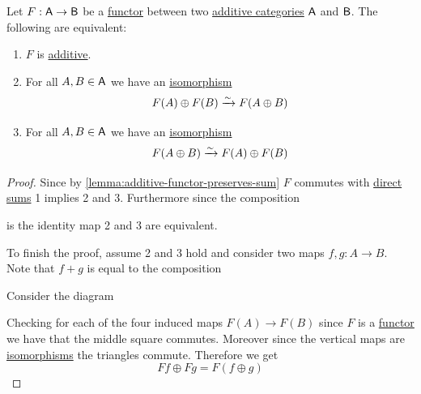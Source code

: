 \documentclass[../../../main]{subfiles}
\begin{document}
\begin{lemma}\label{lemma:additive-functor-characterization}
  Let \(F: \mathsf{A} \to \mathsf{B}\) be a \hyperref[def:functor]{functor} between two \hyperref[def:additive-category]{additive categories} \(\mathsf{A}\) and \(\mathsf{B}\). The following are equivalent:
  \begin{enumerate}
    \item \(F\) is \hyperref[def:additive-functor]{additive}.
    \item For all \(A, B \in \mathsf{A}\) we have an \hyperref[def:categorical-isomorphism]{isomorphism}
          \begin{equation*}
            F(A) \oplus F(B) \xrightarrow{\sim} F(A \oplus B)
          \end{equation*}
    \item For all \(A, B \in \mathsf{A}\) we have an \hyperref[def:categorical-isomorphism]{isomorphism}
          \begin{equation*}
             F(A \oplus B) \xrightarrow{\sim} F(A) \oplus F(B)
          \end{equation*}
  \end{enumerate}
\end{lemma}
\begin{proof}
  Since by \autoref{lemma:additive-functor-preserves-sum} \(F\) commutes with \hyperref[def:direct-sum]{direct sums} 1 implies 2 and 3.
  Furthermore since the composition
  \begin{center}
  \end{center}
  is the identity map 2 and 3 are equivalent.

  To finish the proof, assume 2 and 3 hold and consider two maps \(f, g: A \to B\).
  Note that \(f + g\) is equal to the composition
  \begin{center}
  \end{center}
  Consider the diagram
  \begin{center}
  \end{center}
  Checking for each of the four induced maps \(F(A) \to F(B)\) since \(F\) is a \hyperref[def:functor]{functor} we have that the middle square commutes.
  Moreover since the vertical maps are \hyperref[def:categorical-isomorphism]{isomorphisms} the triangles commute.
  Therefore we get
  \begin{equation*}
    Ff \oplus Fg = F(f \oplus g)
  \end{equation*}
\end{proof}
\end{document}
